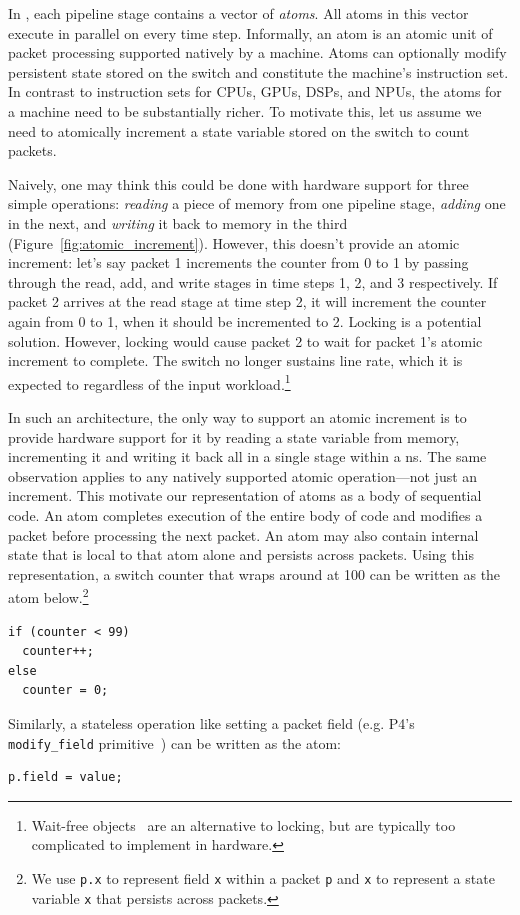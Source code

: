 In \absmachine, each pipeline stage contains a vector of \textit{atoms}. All
atoms in this vector execute in parallel on every time step.  Informally, an
atom is an atomic unit of packet processing supported natively by a \absmachine
machine. Atoms can optionally modify persistent state stored on the switch
and constitute the machine's instruction set.  In contrast to instruction sets for
CPUs, GPUs, DSPs, and NPUs, the atoms for a \absmachine machine need to be
substantially richer. To motivate this, let us assume we need to atomically
increment a state variable stored on the switch to count packets.

Naively, one may think this could be done with hardware support for three
simple operations: \textit{reading} a piece of memory from one pipeline stage,
\textit{adding} one in the next, and \textit{writing} it back to memory in the
third (Figure~\ref{fig:atomic_increment}). However, this doesn't provide an
atomic increment: let's say packet 1 increments the counter from 0 to 1 by
passing through the read, add, and write stages in time steps 1, 2, and 3
respectively.  If packet 2 arrives at the read stage at time step 2, it will
increment the counter again from 0 to 1, when it should be incremented to 2.
Locking is a potential solution. However, locking would cause packet 2 to wait
for packet 1's atomic increment to complete. The switch no longer sustains line
rate, which it is expected to regardless of the input
workload.\footnote{Wait-free objects~\cite{herlihy_wait} are an alternative to locking,
but are typically too complicated to implement in hardware.}

In such an architecture, the only way to support an atomic increment is to
provide hardware support for it by reading a state variable from memory,
incrementing it and writing it back all in a single stage within a ns. The same
observation applies to any natively supported atomic operation---not just an
increment. This motivate our representation of atoms as a body of sequential
code. An atom completes execution of the entire body of code and modifies a
packet before processing the next packet.  An atom may also contain internal
state that is local to that atom alone and persists across packets.  Using this
representation, a switch counter that wraps around at 100 can be written as the
atom below.\footnote{We use {\tt p.x} to represent field {\tt x} within a
  packet {\tt p} and {\tt x} to represent a state variable {\tt x} that
persists across packets.}
\begin{lstlisting}[style=customc, numbers=none, frame=none]
if (counter < 99)
  counter++;
else
  counter = 0;
\end{lstlisting}
Similarly, a stateless operation like setting a packet field (e.g. P4's {\tt
modify\_field} primitive~\cite{p4spec}) can be written as the atom:
\begin{lstlisting}[style=customc, numbers=none, frame=none]
  p.field = value;
\end{lstlisting}

